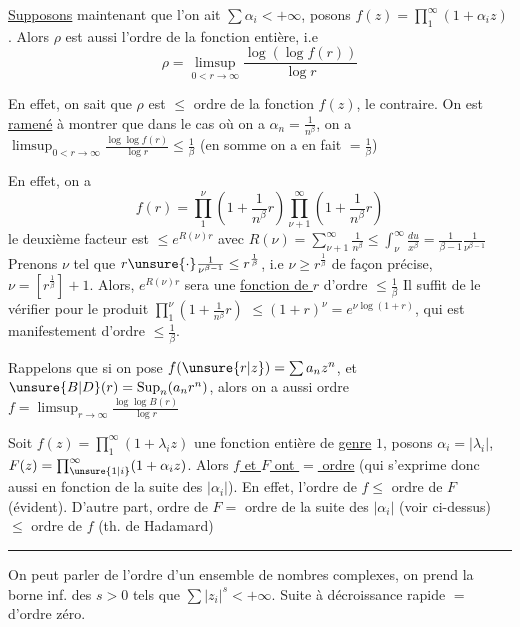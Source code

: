 \uline{Supposons} maintenant que l'on ait $\sum\alpha_i<+\infty$,
posons $f(z)=\prod_1^\infty(1+\alpha_i z)$. Alors $\rho$ est aussi
l'ordre de la fonction entière, i.e
\[ \rho=\limsup_{0<r\to\infty}\frac{\log(\log f(r))}{\log r} \]

En effet, on sait que $\rho$ est $\leq$ ordre de la
fonction $f(z)$,   le contraire. On est
\uline{ramené} à montrer que   dans le
cas où on a $\alpha_n=\frac1{n^\beta}$, on a
$\displaystyle \limsup_{0<r\to\infty}\frac{\log\log f(r)}{\log r}\leq\frac1\beta$ \quad (en somme on a en fait $=\frac1\beta$)

En effet, on a
\[ f(r)=\prod_1^\nu\left(1+\frac1{n^\beta}r\right)\prod_{\nu+1}^{\infty}\left(1+\frac1{n^\beta}r\right) \]
le deuxième facteur est $\leq e^{R(\nu)r}$
avec $\displaystyle R(\nu)=\sum_{\nu+1}^\infty\frac1{n^\beta}\leq\int_\nu^\infty\frac{du}{x^\beta}=\frac1{\beta-1}\frac1{\nu^{\beta-1}}$
Prenons $\nu$ tel que $r\unsure{\cdot}\frac1{\nu^{\beta-1}}\leq r^{\frac1\beta}$, i.e $\nu\geq r^{\frac1\beta}$
de façon précise, $\nu=[r^{\frac1\beta}]+1$. Alors, $e^{R(\nu)r}$
sera une \uline{fonction de $r$} d'ordre $\leq\frac1\beta$ Il
suffit de le vérifier pour le produit $\prod_1^\nu(1+\frac1{n^\beta}r)$
$\leq(1+r)^\nu=e^{\nu\log(1+r)}$, qui est manifestement
d'ordre $\leq\frac1\beta$.

Rappelons que si on pose $f(\unsure{r|z})=\sum a_n z^n$,
 et $\unsure{B|D}(r)=\mathop{\rm Sup}_n(a_n r^n)$, alors on
a aussi \qquad ordre  $f=\limsup_{r\to\infty}\frac{\log\log B(r)}{\log r}$


Soit $f(z)=\prod_1^\infty(1+\lambda_i z)$ une fonction entière
de \uline{genre} $1$, posons $\alpha_i=|\lambda_i|$, $F(z)=\prod_{\unsure{1|i}}^\infty(1+\alpha_i z)$.
Alors \uline{$f$ et $F$ ont $=$ ordre} (qui s'exprime donc
aussi en fonction de la suite des $|\alpha_i|$). En effet,
l'ordre de $f\leq$ ordre de $F$ (évident). D'autre
part, ordre de $F=$ ordre de la suite des $|\alpha_i|$
(voir ci-dessus) $\leq$ ordre de $f$ (th. de Hadamard)
\begin{center}\rule{1.5cm}{0.4pt}\end{center}

On peut parler de l'ordre d'un ensemble  de
nombres complexes,  
on prend la borne inf. des $s>0$ tels que
$\sum|z_i|^s<+\infty$. Suite à décroissance rapide $=$
d'ordre zéro.

